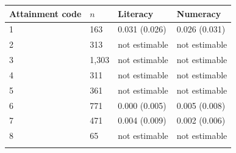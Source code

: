 \setlength{\tabcolsep}{4pt}
\begin{tabular}{@{}llll@{}}
\toprule
Attainment code & $n$ & Literacy & Numeracy\\
\midrule
1 & 163 & 0.031 (0.026) & 0.026 (0.031)\\
2 & 313 & not estimable & not estimable\\
3 & 1,303 & not estimable & not estimable\\
4 & 311 & not estimable & not estimable\\
5 & 361 & not estimable & not estimable\\
6 & 771 & 0.000 (0.005) & 0.005 (0.008)\\
7 & 471 & 0.004 (0.009) & 0.002 (0.006)\\
8 & 65 & not estimable & not estimable\\
\botrule
\end{tabular}
